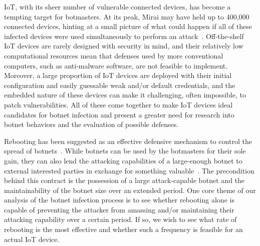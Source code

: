 IoT, with its sheer number of vulnerable connected devices, has become a tempting target for botmasters. At its peak, Mirai may have held up to 400,000 connected devices, hinting at a small picture of what could happen if all of these infected devices were used simultaneously to perform an attack~\cite{kolias2017_Mirai_DDoS}. Off-the-shelf IoT devices are rarely designed with security in mind, and their relatively low computational resources mean that defenses used by more conventional computers, such as anti-malware software, are not feasible to implement. Moreover, a large proportion of IoT devices are deployed with their initial configuration and easily guessable weak and/or default credentials, and the embedded nature of these devices can make it challenging, often impossible, to patch vulnerabilities. All of these come together to make IoT devices ideal candidates for botnet infection and present a greater need for research into botnet behaviors and the evaluation of possible defenses.
\par
Rebooting has been suggested as an effective defensive mechanism to control the spread of botnets~\cite{tanaka2019_PN_Botnet}. While botnets can be used by the botmasters for their sole gain, they can also lend the attacking capabilities of a large-enough botnet to external interested parties in exchange for something valuable~\cite{kolias2017_Mirai_DDoS}. The precondition behind this contract is the possession of a large attack-capable botnet and the maintainability of the botnet size over an extended period. One core theme of our analysis of the botnet infection process is to see whether rebooting alone is capable of preventing the attacker from amassing and/or maintaining their attacking capability over a certain period. If so, we wish to see what rate of rebooting is the most effective and whether such a frequency is feasible for an actual IoT device.
